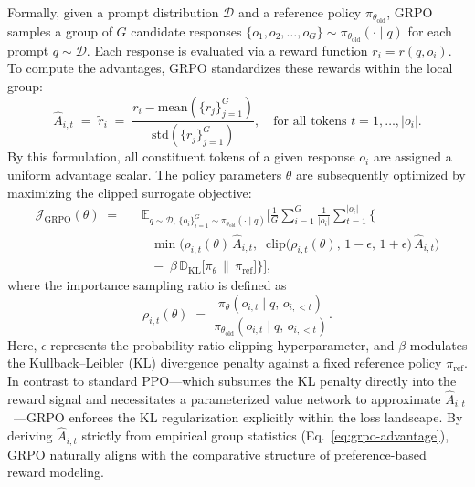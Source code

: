Formally, given a prompt distribution $\mathcal{D}$ and a reference policy $\pi_{\theta_{\text{old}}}$, GRPO samples a group of $G$ candidate responses $\{o_1, o_2, \dots, o_G\} \sim \pi_{\theta_{\text{old}}}(\cdot \mid q)$ for each prompt $q \sim \mathcal{D}$. Each response is evaluated via a reward function $r_i = r(q, o_i)$. To compute the advantages, GRPO standardizes these rewards within the local group:
\begin{equation}
    \hat{A}_{i,t} \;=\; \widetilde{r}_i \;=\; \frac{r_i - \mathrm{mean}(\{r_j\}_{j=1}^G)}{\mathrm{std}(\{r_j\}_{j=1}^G)},
    \quad \text{for all tokens } t = 1, \dots, |o_i|.
    \label{eq:grpo-advantage}
\end{equation}
By this formulation, all constituent tokens of a given response $o_i$ are assigned a uniform advantage scalar. The policy parameters $\theta$ are subsequently optimized by maximizing the clipped surrogate objective:
\begin{equation}
\begin{aligned}
    \mathcal{J}_{\text{GRPO}}(\theta)
    \;=\;&\;\; \mathbb{E}_{q \sim \mathcal{D},\, \{o_i\}_{i=1}^G \sim \pi_{\theta_{\text{old}}}(\cdot \mid q)} \Bigg[
    \frac{1}{G} \sum_{i=1}^{G} \frac{1}{|o_i|} \sum_{t=1}^{|o_i|} \bigg\{ \\
    &\quad\; \min\!\Big( \rho_{i,t}(\theta)\,\hat{A}_{i,t},\;\;
    \mathrm{clip}\bigl(\rho_{i,t}(\theta),\,1{-}\epsilon,\,1{+}\epsilon\bigr)\,\hat{A}_{i,t} \Big) \\
    &\quad\; -\; \beta\, \mathbb{D}_{\text{KL}}\!\bigl[\pi_\theta \,\|\, \pi_{\text{ref}}\bigr] \bigg\} \Bigg],
\end{aligned}
\label{eq:grpo-objective}
\end{equation}
where the importance sampling ratio is defined as
\begin{equation}
    \rho_{i,t}(\theta) \;=\; \frac{\pi_\theta(o_{i,t} \mid q,\, o_{i,<t})}{\pi_{\theta_{\text{old}}}(o_{i,t} \mid q,\, o_{i,<t})}.
\end{equation}
Here, $\epsilon$ represents the probability ratio clipping hyperparameter, and $\beta$ modulates the Kullback--Leibler (KL) divergence penalty against a fixed reference policy $\pi_{\text{ref}}$. In contrast to standard PPO---which subsumes the KL penalty directly into the reward signal and necessitates a parameterized value network to approximate $\hat{A}_{i,t}$~\citep{schulman2017proximal}---GRPO enforces the KL regularization explicitly within the loss landscape. By deriving $\hat{A}_{i,t}$ strictly from empirical group statistics (Eq.~\ref{eq:grpo-advantage}), GRPO naturally aligns with the comparative structure of preference-based reward modeling.

